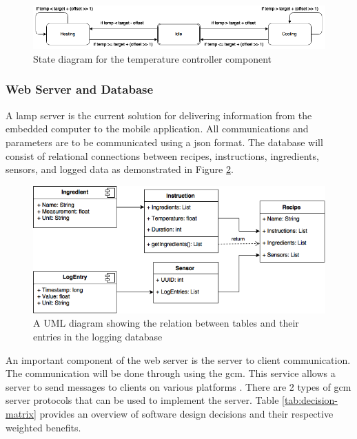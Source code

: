 \documentclass{article}
\begin{document}
\begin{figure}[H]
\begin{center}
\includegraphics[scale=0.50]{temperature-controller-state-diagram.png}
\caption{State diagram for the temperature controller component}
\label{fig:temperature-controller}
\end{center}
\end{figure}

\subsubsection{Web Server and Database}
A \gls{lamp} server is the current solution for delivering information from the embedded computer to the mobile application.  All communications and parameters are to be communicated using a \gls{json} format.  The database will consist of relational connections between recipes, instructions, ingredients, sensors, and logged data as demonstrated in Figure \ref{fig:database-diagram}.

\begin{figure}[H]
\begin{center}
\includegraphics[scale=0.50]{database-uml-diagram.png}
\caption{A UML diagram showing the relation between tables and their entries in the logging database}
\label{fig:database-diagram}
\end{center}
\end{figure}

An important component of the web server is the server to client communication. The communication will be done through using the \gls{gcm}. This service allows a server to send messages to clients on various platforms \cite{gcm}. There are 2 types of \gls{gcm} server protocols that can be used to implement the server.  Table \ref{tab:decision-matrix} provides an overview of software design decisions and their respective weighted benefits.
\end{document}
